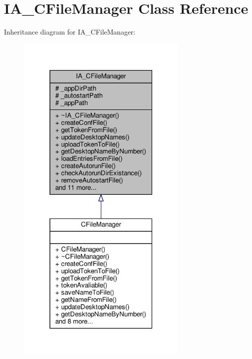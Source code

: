 \hypertarget{classIA__CFileManager}{}\section{I\+A\+\_\+\+C\+File\+Manager Class Reference}
\label{classIA__CFileManager}


Inheritance diagram for I\+A\+\_\+\+C\+File\+Manager\+:
\nopagebreak
\begin{figure}[H]
\begin{center}
\leavevmode
\includegraphics[width=235pt]{classIA__CFileManager__inherit__graph}
\end{center}
\end{figure}


